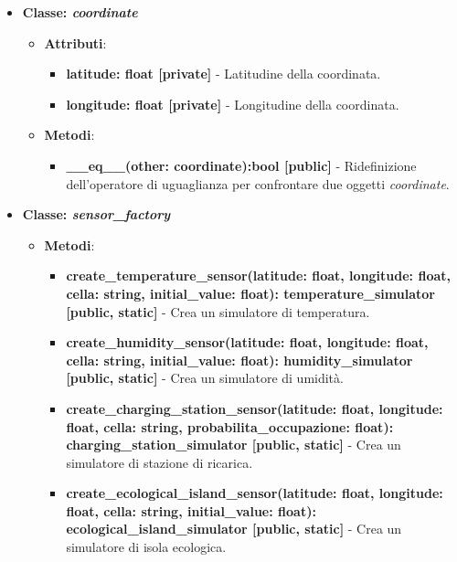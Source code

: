 \begin{itemize}
    \item{\textbf{Classe: \textit{coordinate}}}
    \begin{itemize}
        \item \textbf{Attributi}: 
        \begin{itemize}
            \item \textbf{latitude: float [private]} - Latitudine della coordinata.
            \item \textbf{longitude: float [private]} - Longitudine della coordinata.
        \end{itemize}
        \item \textbf{Metodi}: 
        \begin{itemize}
            \item \textbf{\_\_eq\_\_(other: coordinate):bool [public]} - Ridefinizione dell'operatore di uguaglianza per confrontare due oggetti \textit{coordinate}.
        \end{itemize}
    \end{itemize}

    \item{\textbf{Classe: \textit{sensor\_factory}}}
    \begin{itemize}
        \item \textbf{Metodi}: 
        \begin{itemize}
            \item \textbf{create\_temperature\_sensor(latitude: float, longitude: float, cella: string, initial\_value: float):  temperature\_simulator [public, static]} - Crea un simulatore di temperatura.

            \item \textbf{create\_humidity\_sensor(latitude: float, longitude: float, cella: string, initial\_value: float): humidity\_simulator [public, static]} - Crea un simulatore di umidità.
            
            \item \textbf{create\_charging\_station\_sensor(latitude: float, longitude: float, cella: string, probabilita\_occupazione: float): charging\_station\_simulator [public, static]} - Crea un simulatore di stazione di ricarica.
            
            \item \textbf{create\_ecological\_island\_sensor(latitude: float, longitude: float, cella: string, initial\_value: float): ecological\_island\_simulator [public, static]} - Crea un simulatore di isola ecologica.
            

\end{itemize}
\end{itemize}
\end{itemize}
